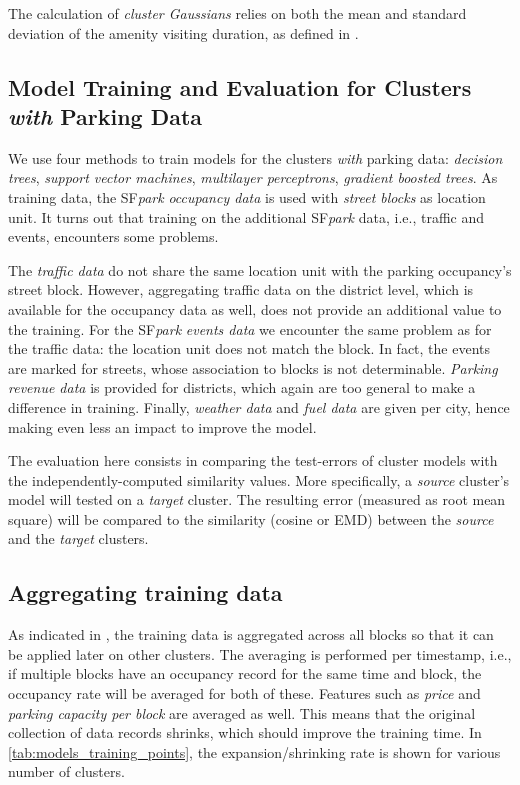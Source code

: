 The calculation of \textit{cluster Gaussians} relies on both the mean and standard deviation of the amenity visiting duration, as defined in .

\subsection{Model Training and Evaluation for Clusters \emph{with} Parking Data}
\label{evaluation:model_training}
We use four methods to train models for the clusters \textit{with} parking data: \textit{decision trees}, \textit{support vector machines}, \textit{multilayer perceptrons}, \textit{gradient boosted trees}. As training data, the SF\textit{park} \textit{occupancy data} is used with \textit{street blocks} as location unit. It turns out that training on the additional SF\textit{park} data, i.e., traffic and events, encounters some problems. 

The \textit{traffic data} do not share the same location unit with the parking occupancy's street block. However, aggregating traffic data on the district level, which is available for the occupancy data as well, does not provide an additional value to the training. For the SF\textit{park} \textit{events data} we encounter the same problem as for the traffic data: the location unit does not match the block.
In fact, the events are marked for streets, whose association to blocks is not determinable. \textit{Parking revenue data} is provided for districts, which again are too general to make a difference in training.
Finally, \textit{weather data} and \textit{fuel data} are given per city, hence making even less an impact to improve the model.

{\color{green}
The evaluation here consists in comparing the test-errors of cluster models with the independently-computed similarity values. More specifically, a \textit{source} cluster's model will tested on a \textit{target} cluster. The resulting error (measured as root mean square) will be compared to the similarity (cosine or EMD) between the \textit{source} and the \textit{target} clusters.  
}

\subsection{Aggregating training data}
\label{evaluation:aggregating_training_data}
As indicated in , the training data is aggregated across all blocks so that it can be applied later on other clusters. The averaging is performed per timestamp, i.e., if multiple blocks have an occupancy record for the same time and block, the occupancy rate will be averaged for both of these. Features such as \textit{price} and \textit{parking capacity per block} are averaged as well. This means that the original collection of data records shrinks{\color{green}, which should improve the training time. In \autoref{tab:models_training_points}, the expansion/shrinking rate is shown for various number of clusters.}

